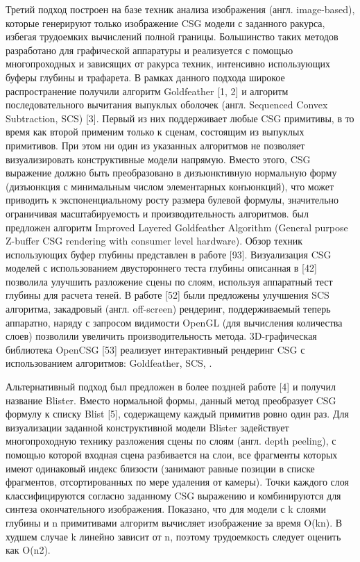 Третий подход построен на базе техник анализа изображения (англ. image-based), которые генерируют только изображение CSG модели с заданного ракурса, избегая трудоемких вычислений полной границы. Большинство таких методов разработано для графической аппаратуры и реализуется с помощью многопроходных и зависящих от ракурса техник, интенсивно использующих буферы глубины и трафарета. В рамках данного подхода широкое распространение получили алгоритм Goldfeather [1, 2] и алгоритм последовательного вычитания выпуклых оболочек (англ. Sequenced Convex Subtraction, SCS) [3]. Первый из них поддерживает любые CSG примитивы, в то время как второй применим только к сценам, состоящим из выпуклых примитивов. При этом ни один из указанных  алгоритмов не позволяет визуализировать конструктивные модели напрямую. Вместо этого, CSG выражение должно быть преобразовано в дизъюнктивную нормальную форму (дизъюнкция с минимальным числом элементарных конъюнкций), что может приводить к экспоненциальному росту размера булевой формулы, значительно ограничивая  масштабируемость и производительность алгоритмов.  был предложен алгоритм Improved Layered Goldfeather Algorithm (General purpose Z-buffer CSG rendering with consumer level hardware). Обзор техник использующих буфер глубины представлен в работе [93]. Визуализация CSG моделей с использованием двустороннего теста глубины описанная в [42] позволила улучшить разложение сцены по слоям, используя аппаратный тест глубины для расчета теней. В работе [52] были предложены улучшения SCS алгоритма, закадровый (англ. off-screen) рендеринг, поддерживаемый теперь аппаратно, наряду с запросом видимости OpenGL (для вычисления количества слоев) позволили увеличить производительность метода. 3D-графическая библиотека OpenCSG [53] реализует интерактивный рендеринг CSG с использованием алгоритмов: Goldfeather, SCS, . 

Альтернативный подход был предложен в более поздней работе [4] и получил название Blister. Вместо нормальной формы, данный метод преобразует CSG формулу к списку Blist [5], содержащему каждый примитив ровно один раз. Для визуализации заданной конструктивной модели Blister задействует многопроходную технику разложения сцены по слоям (англ. depth peeling), с помощью которой входная сцена разбивается на слои, все фрагменты которых имеют одинаковый индекс близости (занимают равные позиции в списке фрагментов, отсортированных по мере удаления от камеры). Точки каждого слоя классифицируются согласно заданному CSG выражению и комбинируются для синтеза окончательного изображения. Показано, что для модели с k слоями глубины и n примитивами алгоритм вычисляет изображение за время O(kn). В худшем случае k линейно зависит от n, поэтому трудоемкость следует оценить как O(n2).

